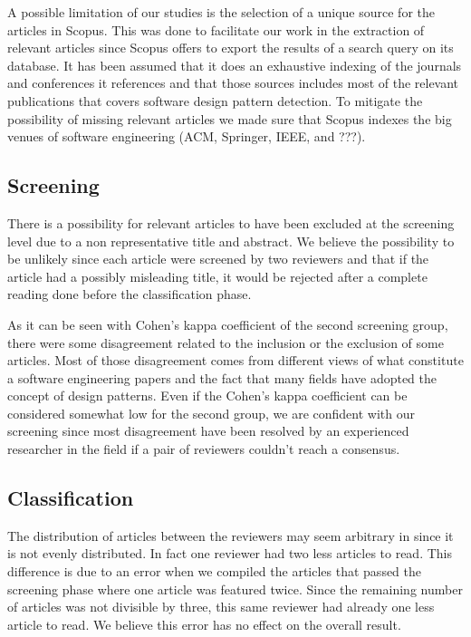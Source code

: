 \documentclass[letterpaper, 10 pt, conference]{ieeeconf}  %
\begin{document}
A possible limitation of our studies is the selection of a unique source for 
the articles in Scopus.
This was done to facilitate our work in the extraction of relevant articles
since Scopus offers to export the results of a search query on its database.
It has been assumed that it does an exhaustive indexing of the journals
and conferences it references and that those sources includes most of the
relevant publications that covers software design pattern detection.
To mitigate the possibility of missing relevant articles we made sure that
Scopus indexes the big venues of software engineering (ACM, Springer, IEEE, and
???).

\subsection{Screening}

There is a possibility for relevant articles to have been excluded at the
screening level due to a non representative title and abstract.
We believe the possibility to be unlikely since each article were screened by
two reviewers and that if the article had a possibly misleading title, it would
be rejected after a complete reading done before the classification phase.

As it can be seen with Cohen's kappa coefficient of the second screening group,
there were some disagreement related to the inclusion or the exclusion of some
articles.
Most of those disagreement comes from different views of what constitute a
software engineering papers and the fact that many fields have adopted the
concept of design patterns.
Even if the Cohen's kappa coefficient can be considered somewhat low for the
second group, we are confident with our screening since most disagreement have
been resolved by an experienced researcher in the field if a pair of reviewers
couldn't reach a consensus.


\subsection{Classification}

The distribution of articles between the reviewers may seem arbitrary in since it is not evenly distributed.
In fact one reviewer had two less articles to read.
This difference is due to an error when we compiled the articles that passed
the screening phase where one article was featured twice.
Since the remaining number of articles was not divisible by three, this same
reviewer had already one less article to read.
We believe this error has no effect on the overall result. \\
\end{document}

